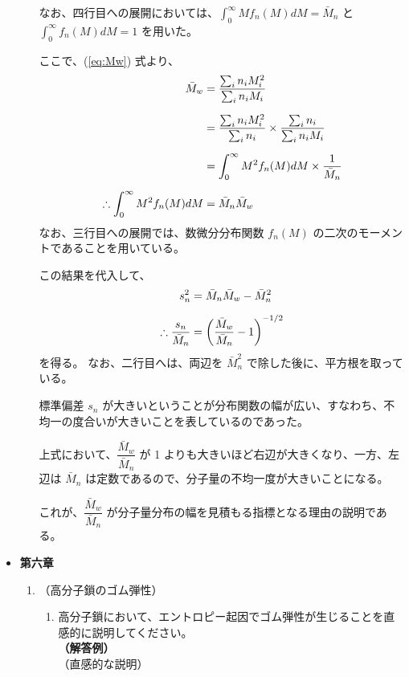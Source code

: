 \documentclass[uplatex,dvipdfmx,a4paper,11pt, titlepage]{jsarticle}
\begin{document}
\begin{itemize}
\begin{enumerate}
	なお、四行目への展開においては、$\displaystyle \int_0^{\infty} M f_n(M) dM = \bar{M}_n$ と $\displaystyle \int_0^{\infty} f_n(M) dM = 1$ を用いた。

	ここで、(\ref{eq:Mw}) 式より、
	\begin{align}
	{\bar M}_w 
		&= \dfrac{\sum_i n_i M_i^2}{\sum_i n_i M_i}\notag \\[6pt]
		&= \dfrac{\sum_i n_i M_i^2}{\sum_i n_i} \times \dfrac{\sum_i n_i}{\sum_i n_i M_i}\notag \\[6pt]
		&= \displaystyle \int_0^{\infty} M^2 f_n(M) dM \times \dfrac{1}{\bar{M}_n }\notag \\[6pt]
	\therefore \displaystyle \int_0^{\infty} M^2 f_n(M) dM &= \bar{M}_n \bar{M}_w
	\end{align}
	なお、三行目への展開では、数微分分布関数 $f_n(M)$ の二次のモーメントであることを用いている。

	この結果を代入して、
	\begin{align}
	s_n^2 &= \bar{M}_n \bar{M}_w - \bar{M}_n^2\notag \\[6pt]
	\therefore \dfrac{s_n}{\bar{M}_n} &= \left(\dfrac{\bar{M}_w}{ \bar{M}_n} - 1 \right)^{-1/2}
	\end{align}
	を得る。
	なお、二行目へは、両辺を $\bar{M}_n^2$ で除した後に、平方根を取っている。

	標準偏差 $s_n$ が大きいということが分布関数の幅が広い、すなわち、不均一の度合いが大きいことを表しているのであった。

	上式において、$\dfrac{\bar{M}_w}{\bar{M}_n}$ が 1 よりも大きいほど右辺が大きくなり、一方、左辺は $\bar{M}_n$ は定数であるので、分子量の不均一度が大きいことになる。

	これが、$\dfrac{\bar{M}_w}{\bar{M}_n}$ が分子量分布の幅を見積もる指標となる理由の説明である。

	\end{enumerate}

\item
{\bf 第六章}
	\begin{enumerate}
	\item
	（高分子鎖のゴム弾性）\\
		\vspace{-5mm}
		\begin{enumerate}
		\item
		\label{it:5-1}
		高分子鎖において、エントロピー起因でゴム弾性が生じることを直感的に説明してください。\\
		{\bf（解答例）}\\
		（直感的な説明）


\end{enumerate}
\end{enumerate}
\end{itemize}
\end{document}
